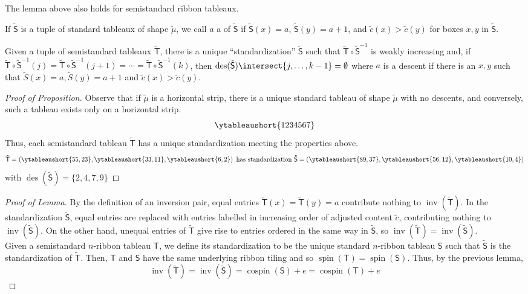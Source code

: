 \documentclass[11pt,leqno,oneside]{amsart}
\numberwithin{thm}{section}
\newcommand{\T}{\mathsf{T}} %
\renewcommand{\S}{\mathsf{S}}
\newcommand{\inv}{\operatorname{inv}}
\newcommand{\des}{\operatorname{des}}
\newcommand{\spin}{\operatorname{spin}}
\newcommand{\cospin}{\operatorname{cospin}}
\begin{document}
\begin{lem}
  The lemma above also holds for semistandard ribbon tableaux.
\end{lem}
\begin{defn}
  If \(\tilde{\S}\) is a tuple of standard tableaux of shape
  \(\tilde{\mu}\), we call \(a\) a  of \(\tilde{\S}\) if
  \(\tilde{\S}(x) = a\), \(\tilde{\S}(y) = a+1\), and \(\tilde{c}(x) >
  \tilde{c}(y)\) for boxes \(x,y\) in \(\tilde{\S}\).
\end{defn}
\begin{prop}
  Given a tuple of semistandard tableaux \(\tilde{\T}\), there is a
  unique ``standardization'' \(\tilde{\S}\) such that \(\tilde{\T} \circ
  \tilde{\S}^{-1}\) is weakly increasing and, if \(\tilde{\T} \circ \tilde{\S}^{-1}(j) = \tilde{\T}
  \circ \tilde{\S}^{-1}(j+1) = \cdots = \tilde{\T} \circ \tilde{\S}^{-1}(k)\), then \(\des(\tilde{\S})
  \intersect \{j, \ldots, k-1\} = \emptyset\) where \(a\) is a descent
  if there is an \(x,y\) such that \(\tilde{S}(x) = a, \tilde{S}(y) =
  a+1\) and \(\tilde{c}(x) > \tilde{c}(y)\).
\end{prop}
\begin{proof}[Proof of Proposition]
  Observe that if \(\tilde{\mu}\) is a horizontal strip, there is a
  unique standard tableau of shape \(\tilde{\mu}\) with no descents,
  and conversely, such a tableau exists only on a horizontal strip. \[
    \ytableaushort{1234567}
  \]
  Thus, each semistandard tableau \(\tilde{\T}\) has a unique
  standardization meeting the properties above.
  \[
    \tilde{\T} = \left( \ytableaushort{55,23}, \ytableaushort{33,11},
      \ytableaushort{6,2} \right) \text{ has standardization }
    \tilde{\S} = \left(
      \ytableaushort{89,37}, \ytableaushort{56,12}, \ytableaushort{{10},4} \right)
  \]
  with \(\des(\tilde{\S}) = \{2,4,7,9\}\)
\end{proof}
\begin{proof}[Proof of Lemma]
  By the definition of an inversion pair, equal entries \(\tilde{\T}(x) =
  \tilde{\T}(y) = a\) contribute nothing to \(\inv(\tilde{\T})\). In
  the standardization \(\tilde{\S}\), equal entries are replaced with
  entries labelled in increasing order of adjusted content
  \(\tilde{c}\), contributing nothing to \(\inv(\tilde{\S})\). On the
  other hand, unequal entries of \(\tilde{\T}\) give rise to entries
  ordered in the same way in \(\tilde{\S}\), so \(\inv(\tilde{\T}) =
  \inv(\tilde{\S})\). \\

  Given a semistandard \(n\)-ribbon tableau \(\T\), we define its
  standardization to be the unique standard \(n\)-ribbon tableau
  \(\S\) such that \(\tilde{\S}\) is the standardization of
  \(\tilde{\T}\). Then, \(\T\) and \(\S\) have the same underlying
  ribbon tiling and so \(\spin(\T) = \spin(\S)\). Thus, by the
  previous lemma, \[
    \inv(\tilde{\T}) = \inv(\tilde{\S}) = \cospin(\S)+e = \cospin(\T)+e
  \]
\end{proof}
\end{document}
